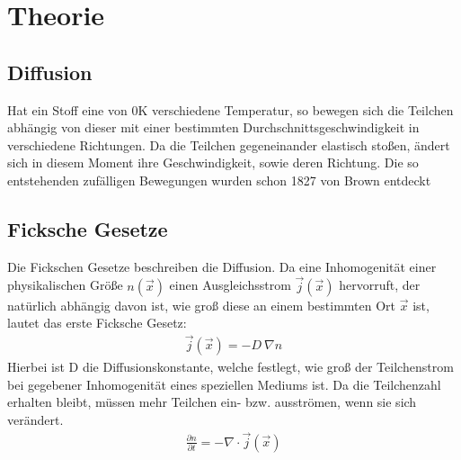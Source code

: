 \documentclass[12pt,a4paper,titlepage,headinclude,bibtotoc]{scrartcl}
\begin{document}
\section{Theorie}
\label{sec:theorie}
\subsection{Diffusion}
Hat ein Stoff eine von 0K verschiedene Temperatur, so bewegen sich die Teilchen abhängig von dieser mit einer bestimmten Durchschnittsgeschwindigkeit in verschiedene Richtungen.
Da die Teilchen gegeneinander elastisch stoßen, ändert sich in diesem Moment ihre Geschwindigkeit, sowie deren Richtung.
Die so entstehenden zufälligen Bewegungen wurden schon 1827 von Brown entdeckt \cite[S. 8]{demtroeder}

\subsection{Ficksche Gesetze}
Die Fickschen Gesetze beschreiben die Diffusion.
Da eine Inhomogenität einer physikalischen Größe $n(\vec x)$ einen Ausgleichsstrom $\vec j(\vec x)$ hervorruft, der natürlich abhängig davon ist, wie groß diese an einem bestimmten Ort $\vec x$ ist, lautet das erste Ficksche Gesetz:
\begin{align}
\vec j(\vec x)=-D ~ \nabla n
\end{align}
Hierbei ist D die Diffusionskonstante, welche festlegt, wie groß der Teilchenstrom bei gegebener Inhomogenität eines speziellen Mediums ist.
Da die Teilchenzahl erhalten bleibt, müssen mehr Teilchen ein- bzw. ausströmen, wenn sie sich verändert.
\begin{align}
 \frac{\partial n}{\partial t}=-\nabla\cdot \vec j(\vec x)
\end{align}
\end{document}
